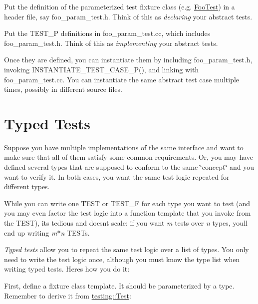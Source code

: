 \begin{DoxyEnumerate}
\item Put the definition of the parameterized test fixture class (e.\+g. {\ttfamily \hyperlink{classFooTest}{Foo\+Test}}) in a header file, say {\ttfamily foo\+\_\+param\+\_\+test.\+h}. Think of this as {\itshape declaring} your abstract tests.
\end{DoxyEnumerate}
\begin{DoxyEnumerate}
\item Put the {\ttfamily T\+E\+S\+T\+\_\+P} definitions in {\ttfamily foo\+\_\+param\+\_\+test.\+cc}, which includes {\ttfamily foo\+\_\+param\+\_\+test.\+h}. Think of this as {\itshape implementing} your abstract tests.
\end{DoxyEnumerate}

Once they are defined, you can instantiate them by including {\ttfamily foo\+\_\+param\+\_\+test.\+h}, invoking {\ttfamily I\+N\+S\+T\+A\+N\+T\+I\+A\+T\+E\+\_\+\+T\+E\+S\+T\+\_\+\+C\+A\+S\+E\+\_\+\+P()}, and linking with {\ttfamily foo\+\_\+param\+\_\+test.\+cc}. You can instantiate the same abstract test case multiple times, possibly in different source files.

\section*{Typed Tests}

Suppose you have multiple implementations of the same interface and want to make sure that all of them satisfy some common requirements. Or, you may have defined several types that are supposed to conform to the same \char`\"{}concept\char`\"{} and you want to verify it. In both cases, you want the same test logic repeated for different types.

While you can write one {\ttfamily T\+E\+ST} or {\ttfamily T\+E\+S\+T\+\_\+F} for each type you want to test (and you may even factor the test logic into a function template that you invoke from the {\ttfamily T\+E\+ST}), it\textquotesingle{}s tedious and doesn\textquotesingle{}t scale\+: if you want {\itshape m} tests over {\itshape n} types, you\textquotesingle{}ll end up writing {\itshape m$\ast$n} {\ttfamily T\+E\+ST}s.

{\itshape Typed tests} allow you to repeat the same test logic over a list of types. You only need to write the test logic once, although you must know the type list when writing typed tests. Here\textquotesingle{}s how you do it\+:

First, define a fixture class template. It should be parameterized by a type. Remember to derive it from {\ttfamily \hyperlink{classtesting_1_1Test}{testing\+::\+Test}}\+:


